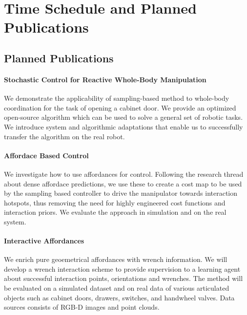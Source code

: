 \section{Time Schedule and Planned Publications}
\label{sec:time_schedule}


\subsection{Planned Publications}
\paragraph{Stochastic Control for Reactive Whole-Body Manipulation} We demonstrate the applicability of sampling-based method to whole-body coordination for the task of opening a cabinet door. We provide an optimized open-source algorithm which can be used to solve a general set of robotic tasks. We introduce system and algorithmic adaptations that enable us to successfully transfer the algorithm on the real robot.

\paragraph{Affordace Based Control} We investigate how to use affordances for control. Following the research thread about dense affordace predictions, we use these to create a cost map to be used by the sampling based controller to drive the manipulator towards interaction hotspots, thus removing the need for highly engineered cost functions and interaction priors. We evaluate the approach in simulation and on the real system. 

\paragraph{Interactive Affordances} We enrich pure geoemetrical affordances with wrench information. We will develop a wrench interaction scheme to provide supervision to a learning agent about successful interaction points, orientations and wrenches. The method will be evaluated on a simulated dataset and on real data of various articulated objects such as cabinet doors, drawers, switches, and handwheel valves. Data sources consists of RGB-D images and point clouds. 


